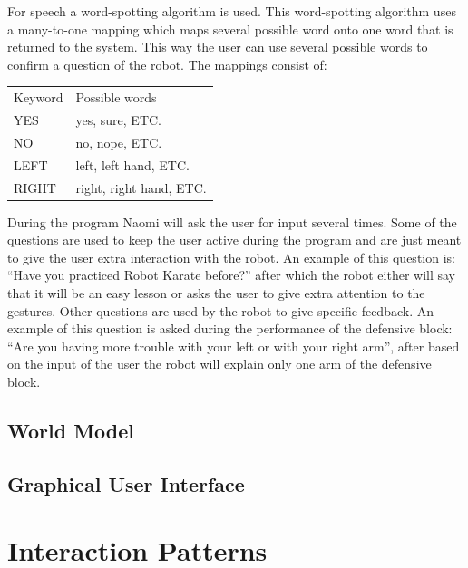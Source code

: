 \documentclass[10pt,a4paper,oneside]{scrartcl}
\begin{document}
For speech a word-spotting algorithm is used.
This word-spotting algorithm uses a many-to-one mapping which maps several possible word onto one word that is returned to the system. 
This way the user can use several possible words to confirm a question of the robot. 
The mappings consist of: 
\begin{table}
  \begin{tabular}{ll}
    Keyword & Possible words           \\
    YES     & yes, sure, ETC.          \\
    NO      & no, nope, ETC.           \\
    LEFT    & left, left hand, ETC.    \\
    RIGHT   & right, right hand, ETC.  \\
  \end{tabular}
\end{table}

During the program Naomi will ask the user for input several times. 
Some of the questions are used to keep the user active during the program and are just meant to give the user extra interaction with the robot. 
An example of this question is: ``Have you practiced Robot Karate before?'' after which the robot either will say that it will be an easy lesson or asks the user to give extra attention to the gestures. 
Other questions are used by the robot to give specific feedback.
An example of this question is asked during the performance of the defensive block: ``Are you having more trouble with your left or with your right arm'', after based on the input of the user the robot will explain only one arm of the defensive block. 

\subsection{World Model}

\subsection{Graphical User Interface}



\section{Interaction Patterns}
\end{document}
